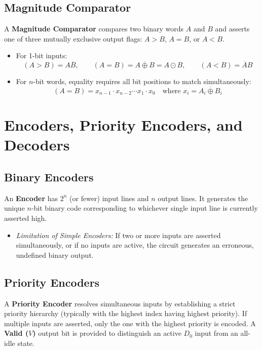 \subsection{Magnitude Comparator}
A \textbf{Magnitude Comparator} compares two binary words $A$ and $B$ and asserts one of three mutually exclusive output flags: $A > B$, $A = B$, or $A < B$.
\begin{itemize}
    \item For 1-bit inputs:
    \[ (A > B) = A\overline{B}, \qquad (A = B) = \overline{A \oplus B} = A \odot B, \qquad (A < B) = \overline{A}B \]
    \item For $n$-bit words, equality requires all bit positions to match simultaneously:
    \[ (A = B) = x_{n-1} \cdot x_{n-2} \cdots x_1 \cdot x_0 \quad \text{where } x_i = \overline{A_i \oplus B_i} \]
\end{itemize}


\section{Encoders, Priority Encoders, and Decoders}
\label{sec:encoders_decoders}

\subsection{Binary Encoders}
An \textbf{Encoder} has $2^n$ (or fewer) input lines and $n$ output lines. It generates the unique $n$-bit binary code corresponding to whichever single input line is currently asserted high.
\begin{itemize}
    \item \textit{Limitation of Simple Encoders:} If two or more inputs are asserted simultaneously, or if no inputs are active, the circuit generates an erroneous, undefined binary output.
\end{itemize}

\subsection{Priority Encoders}
A \textbf{Priority Encoder} resolves simultaneous inputs by establishing a strict priority hierarchy (typically with the highest index having highest priority). If multiple inputs are asserted, only the one with the highest priority is encoded. A \textbf{Valid ($V$)} output bit is provided to distinguish an active $D_0$ input from an all-idle state.

